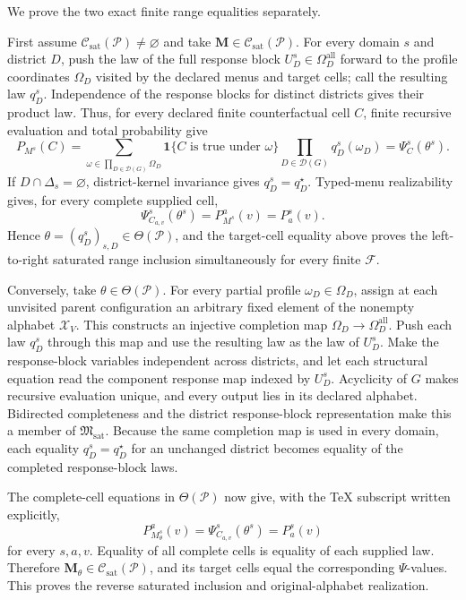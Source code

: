 We prove the two exact finite range equalities separately.

First assume \(\mathcal C_{\mathrm{sat}}(\mathcal P)\ne\varnothing\) and take \(\mathbf M\in\mathcal C_{\mathrm{sat}}(\mathcal P)\). For every domain \(s\) and district \(D\), push the law of the full response block \(U_D^s\in\Omega_D^{\mathrm{all}}\) forward to the profile coordinates \(\Omega_D\) visited by the declared menus and target cells; call the resulting law \(q_D^s\). Independence of the response blocks for distinct districts gives their product law. Thus, for every declared finite counterfactual cell \(C\), finite recursive evaluation and total probability give
\[
P_{M^s}(C)
=\sum_{\omega\in\prod_{D\in\mathcal D(G)}\Omega_D}
\mathbf 1\{C\text{ is true under }\omega\}
\prod_{D\in\mathcal D(G)}q_D^s(\omega_D)
=\Psi_C^s(\theta^s).
\]
If \(D\cap\Delta_s=\varnothing\), district-kernel invariance gives \(q_D^s=q_D^\star\). Typed-menu realizability gives, for every complete supplied cell,
\[
\Psi_{C_{a,v}}^s(\theta^s)=P_{M^s}^{a}(v)=P_a^s(v).
\]
Hence \(\theta=(q_D^s)_{s,D}\in\Theta(\mathcal P)\), and the target-cell equality above proves the left-to-right saturated range inclusion simultaneously for every finite \(\mathcal F\).

Conversely, take \(\theta\in\Theta(\mathcal P)\). For every partial profile \(\omega_D\in\Omega_D\), assign at each unvisited parent configuration an arbitrary fixed element of the nonempty alphabet \(\mathcal X_V\). This constructs an injective completion map \(\Omega_D\to\Omega_D^{\mathrm{all}}\). Push each law \(q_D^s\) through this map and use the resulting law as the law of \(U_D^s\). Make the response-block variables independent across districts, and let each structural equation read the component response map indexed by \(U_D^s\). Acyclicity of \(G\) makes recursive evaluation unique, and every output lies in its declared alphabet. Bidirected completeness and the district response-block representation make this a member of \(\mathfrak M_{\mathrm{sat}}\). Because the same completion map is used in every domain, each equality \(q_D^s=q_D^\star\) for an unchanged district becomes equality of the completed response-block laws.

The complete-cell equations in \(\Theta(\mathcal P)\) now give, with the TeX subscript written explicitly,
\[
P_{M_\theta^s}^{a}(v)
=\Psi_{C_{a,v}}^s(\theta^s)
=P_a^s(v)
\]
for every \(s,a,v\). Equality of all complete cells is equality of each supplied law. Therefore \(\mathbf M_\theta\in\mathcal C_{\mathrm{sat}}(\mathcal P)\), and its target cells equal the corresponding \(\Psi\)-values. This proves the reverse saturated inclusion and original-alphabet realization.

